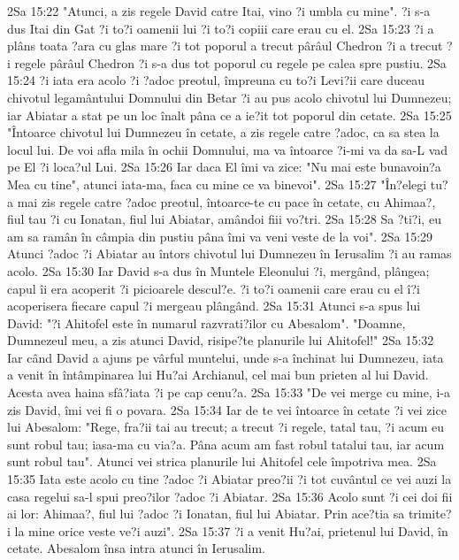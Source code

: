 2Sa 15:22  "Atunci, a zis regele David catre Itai, vino ?i umbla cu mine". ?i s-a dus Itai din Gat ?i to?i oamenii lui ?i to?i copiii care erau cu el.
2Sa 15:23  ?i a plâns toata ?ara cu glas mare ?i tot poporul a trecut pârâul Chedron ?i a trecut ?i regele pârâul Chedron ?i s-a dus tot poporul cu regele pe calea spre pustiu.
2Sa 15:24  ?i iata era acolo ?i ?adoc preotul, împreuna cu to?i Levi?ii care duceau chivotul legamântului Domnului din Betar ?i au pus acolo chivotul lui Dumnezeu; iar Abiatar a stat pe un loc înalt pâna ce a ie?it tot poporul din cetate.
2Sa 15:25  "Întoarce chivotul lui Dumnezeu în cetate, a zis regele catre ?adoc, ca sa stea la locul lui. De voi afla mila în ochii Domnului, ma va întoarce ?i-mi va da sa-L vad pe El ?i loca?ul Lui.
2Sa 15:26  Iar daca El îmi va zice: "Nu mai este bunavoin?a Mea cu tine", atunci iata-ma, faca cu mine ce va binevoi".
2Sa 15:27  "În?elegi tu? a mai zis regele catre ?adoc preotul, întoarce-te cu pace în cetate, cu Ahimaa?, fiul tau ?i cu Ionatan, fiul lui Abiatar, amândoi fiii vo?tri.
2Sa 15:28  Sa ?ti?i, eu am sa ramân în câmpia din pustiu pâna îmi va veni veste de la voi".
2Sa 15:29  Atunci ?adoc ?i Abiatar au întors chivotul lui Dumnezeu în Ierusalim ?i au ramas acolo.
2Sa 15:30  Iar David s-a dus în Muntele Eleonului ?i, mergând, plângea; capul îi era acoperit ?i picioarele descul?e. ?i to?i oamenii care erau cu el î?i acoperisera fiecare capul ?i mergeau plângând.
2Sa 15:31  Atunci s-a spus lui David: "?i Ahitofel este în numarul razvrati?ilor cu Abesalom". "Doamne, Dumnezeul meu, a zis atunci David, risipe?te planurile lui Ahitofel!"
2Sa 15:32  Iar când David a ajuns pe vârful muntelui, unde s-a închinat lui Dumnezeu, iata a venit în întâmpinarea lui Hu?ai Archianul, cel mai bun prieten al lui David. Acesta avea haina sfâ?iata ?i pe cap cenu?a.
2Sa 15:33  "De vei merge cu mine, i-a zis David, îmi vei fi o povara.
2Sa 15:34  Iar de te vei întoarce în cetate ?i vei zice lui Abesalom: "Rege, fra?ii tai au trecut; a trecut ?i regele, tatal tau, ?i acum eu sunt robul tau; iasa-ma cu via?a. Pâna acum am fast robul tatalui tau, iar acum sunt robul tau". Atunci vei strica planurile lui Ahitofel cele împotriva mea.
2Sa 15:35  Iata este acolo cu tine ?adoc ?i Abiatar preo?ii ?i tot cuvântul ce vei auzi la casa regelui sa-l spui preo?ilor ?adoc ?i Abiatar.
2Sa 15:36  Acolo sunt ?i cei doi fii ai lor: Ahimaa?, fiul lui ?adoc ?i Ionatan, fiul lui Abiatar. Prin ace?tia sa trimite?i la mine orice veste ve?i auzi".
2Sa 15:37  ?i a venit Hu?ai, prietenul lui David, în cetate. Abesalom însa intra atunci în Ierusalim.
